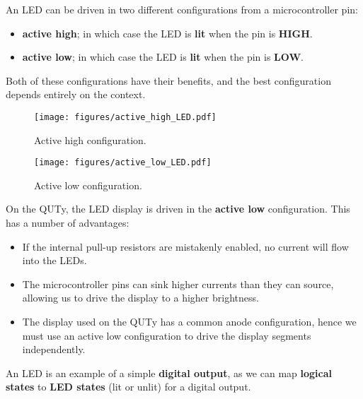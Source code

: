 \documentclass{article}
\begin{document}
An LED can be driven in two different configurations from a
microcontroller pin:
\begin{itemize}
    \item \textbf{active high}; in which case the LED is \textbf{lit} when the pin is \textbf{HIGH}.
    \item \textbf{active low}; in which case the LED is \textbf{lit} when the pin is \textbf{LOW}.
\end{itemize}
Both of these configurations have their benefits, and the best
configuration depends entirely on the context.
\pagebreak

\begin{multicols}{2}
    \begin{figure}[H]
        \centering
        \texttt{[image: figures/active\_high\_LED.pdf]}
        \caption{Active high configuration.} %
    \end{figure}
    \begin{figure}[H]
        \centering
        \texttt{[image: figures/active\_low\_LED.pdf]}
        \caption{Active low configuration.} %
    \end{figure}
\end{multicols}
On the QUTy, the LED display is driven in the \textbf{active low} configuration.
This has a number of advantages:
\begin{itemize}
    \item If the internal pull-up resistors are mistakenly enabled, no
          current will flow into the LEDs.
    \item The microcontroller pins can sink higher currents than they
          can source, allowing us to drive the display to a higher
          brightness.
    \item The display used on the QUTy has a common anode
          configuration, hence we must use an active low configuration
          to drive the display segments independently.
\end{itemize}
An LED is an example of a simple \textbf{digital output}, as we can map \textbf{logical states}
to \textbf{LED states} (lit or unlit) for a digital output.
\end{document}
